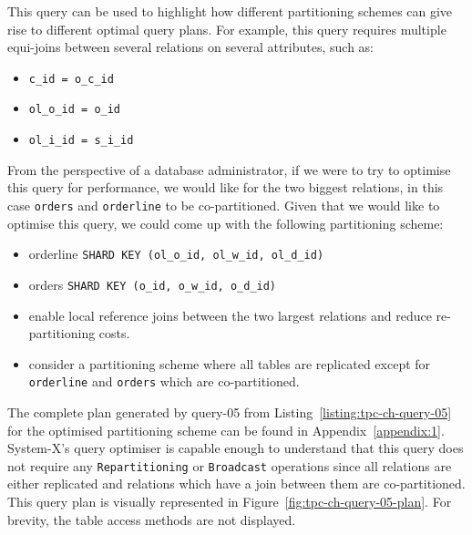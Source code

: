 This query can be used to highlight how different partitioning schemes can give rise to different optimal query plans. For example, this query requires multiple equi-joins between several relations on several attributes, such as:
    \begin{itemize}
        \item \texttt{c\_id = o\_c\_id}
        \item \texttt{ol\_o\_id = o\_id}
        \item \texttt{ol\_i\_id = s\_i\_id}
    \end{itemize}
From the perspective of a database administrator, if we were to try to optimise this query for performance, we would like for the two biggest relations, in this case \texttt{orders} and \texttt{orderline} to be co-partitioned. Given that we would like to optimise this query, we could come up with the following partitioning scheme:
    \begin{itemize}
        \item orderline \texttt{SHARD KEY (ol\_o\_id, ol\_w\_id, ol\_d\_id)}
        \item orders \texttt{SHARD KEY (o\_id, o\_w\_id, o\_d\_id)}
        \item enable local reference joins between the two largest relations and reduce re-partitioning costs.
        \item consider a partitioning scheme where all tables are replicated except for \texttt{orderline} and \texttt{orders} which are co-partitioned.
    \end{itemize}

The complete plan generated by query-05 from Listing~\ref{listing:tpc-ch-query-05} for the optimised partitioning scheme can be found in Appendix~\ref{appendix:1}. System-X's query optimiser is capable enough to understand that this query does not require any \texttt{Repartitioning} or \texttt{Broadcast} operations since all relations are either replicated and relations which have a join between them are co-partitioned. This query plan is visually represented in Figure~\ref{fig:tpc-ch-query-05-plan}. For brevity, the table access methods are not displayed. 


